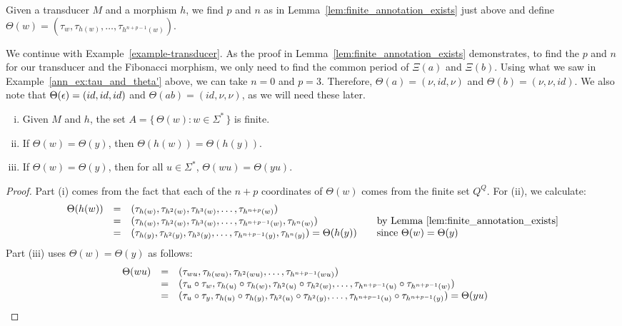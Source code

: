 \begin{definition}[$\Theta(w)$]
  Given a  transducer $M$ and a morphism $h$, we find $p$ and $n$ as in Lemma~\ref{lem:finite_annotation_exists}
  just above and define $\Theta(w) = (\tau_w, \tau_{h(w)}, \ldots, \tau_{h^{n+p-1}(w)})$.
\label{def-Theta}
\end{definition}

\begin{example}  We continue with Example~\ref{example-transducer}.
  As the proof in Lemma~\ref{lem:finite_annotation_exists} demonstrates, to find the $p$ and $n$ for our transducer and the
   Fibonacci morphism, we only need to  find the common period of  $\Xi(a)$ and $\Xi(b)$.
Using what we saw in Example~\ref{ann_ex:tau_and_theta'} above,  we can  take $n = 0$ and $p = 3$. 
  Therefore, $\Theta(a) = (\nu, id, \nu)$ and $\Theta(b) = (\nu, \nu, id)$. 
  We also note that $\Theta(\epsilon) = (id, id, id)$ and $\Theta(ab) = (id, \nu, \nu)$, as we will need these later.
\end{example}

\begin{lemma}
\begin{enumerate}[(i)]
\item Given $M$ and $h$, the set $A = \{\, \Theta(w) : w \in \Sigma^*\,\}$
  is finite.
  \item 
 If   $\Theta(w) = \Theta(y)$, then $\Theta(h(w)) = \Theta(h(y))$.
\item  If   $\Theta(w) = \Theta(y)$, then for all $u\in\Sigma^*$,  $\Theta(wu) = \Theta(y u)$.
\end{enumerate}
\label{lemma-for-welldefinedness}
\end{lemma}

\begin{proof}
Part (i) comes from the fact
that  each of the $n+p$ coordinates of $\Theta(w)$ comes from the finite set $Q^Q$.
For (ii), we calculate:
$$\begin{array}{lcl@{\qquad}l}
  \Theta(h(w)) & = & (\tau_{h(w)}, \tau_{h^2(w)}, \tau_{h^3(w)}, \ldots ,\tau_{h^{n+p}(w)}) \\
  &=& (\tau_{h(w)}, \tau_{h^2(w)}, \tau_{h^3(w)}, \ldots,  \tau_{h^{n+p-1}(w)} ,\tau_{h^{n}(w)})  
& \mbox{by Lemma~\ref{lem:finite_annotation_exists}}
\\
 & = & (\tau_{h(y)}, \tau_{h^2(y)}, \tau_{h^3(y)}, \ldots,   \tau_{h^{n+p-1}(y)}, \tau_{h^{n}(y)}) = \Theta(h(y))
 & \mbox{since $\Theta(w) = \Theta(y)$} \end{array}
$$
Part (iii) uses $\Theta(w) = \Theta(y)$ as follows:
$$\begin{array}{lcl@{\qquad}l}
\Theta(w u) & = & (\tau_{wu}, \tau_{h(wu)}, \tau_{h^2(wu)}, \ldots ,\tau_{h^{n+p-1}(wu)})  \\
  & = & (\tau_u\circ \tau_{w},  \tau_{h(u)}\circ \tau_{h(w)}, \tau_{h^2(u)}\circ \tau_{h^2(w)}, \ldots ,\tau_{h^{n+p-1}(u)}\circ \tau_{h^{n+p-1}(w)})  \\
  & = & (\tau_u\circ \tau_{y},  \tau_{h(u)}\circ \tau_{h(y)}, \tau_{h^2(u)}\circ \tau_{h^2(y)}, \ldots ,\tau_{h^{n+p-1}(u)}\circ \tau_{h^{n+p-1}(y)}) 
  = \Theta(y u)
\end{array}
$$
\end{proof}



